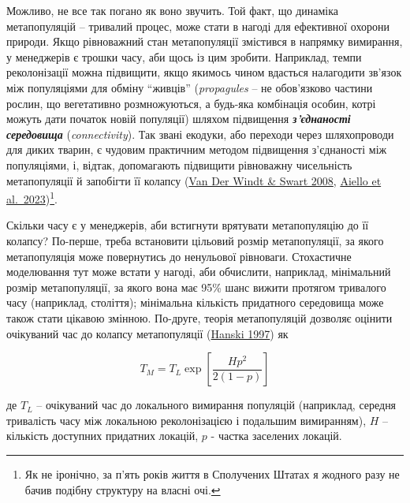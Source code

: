 \documentclass[
  11pt,
]{book}
\begin{document}
Можливо, не все так погано як воно звучить. Той факт, що динаміка метапопуляцій -- тривалий процес, може стати в нагоді для ефективної охорони природи. Якщо рівноважний стан метапопуляції змістився в напрямку вимирання, у менеджерів є трошки часу, аби щось із цим зробити. Наприклад, темпи реколонізації можна підвищити, якщо якимось чином вдасться налагодити зв'язок між популяціями для обміну ``живців'' (\emph{propagules} -- не обов'язково частини рослин, що вегетативно розмножуються, а будь-яка комбінація особин, котрі можуть дати початок новій популяції) шляхом підвищення \textbf{\emph{з'єднаності середовища}} (\emph{connectivity}). Так звані екодуки, або переходи через шляхопроводи для диких тварин, є чудовим практичним методом підвищення з'єднаності між популяціями, і, відтак, допомагають підвищити рівноважну чисельність метапопуляції й запобігти її колапсу (\href{https://doi.org/10.1111/j.1365-2664.2007.01404.x}{Van Der Windt \& Swart 2008}, \href{https://doi.org/10.1007/s10980-023-01600-6}{Aiello et al.~2023})\footnote{Як не іронічно, за п'ять років життя в Сполучених Штатах я жодного разу не бачив подібну структуру на власні очі.}.

Скільки часу є у менеджерів, аби встигнути врятувати метапопуляцію до її колапсу? По-перше, треба встановити цільовий розмір метапопуляції, за якого метапопуляція може повернутись до ненульової рівноваги. Стохастичне моделювання тут може встати у нагоді, аби обчислити, наприклад, мінімальний розмір метапопуляції, за якого вона має 95\% шанс вижити протягом тривалого часу (наприклад, століття); мінімальна кількість придатного середовища може також стати цікавою змінною. По-друге, теорія метапопуляцій дозволяє оцінити очікуваний час до колапсу метапопуляції (\href{htpps://doi.org/10.1016/B978-012323445-2/50007-9}{Hanski 1997}) як

\[T_M = T_L \exp[\frac{Hp^2}{2(1-p)}]\]

де \(T_L\) -- очікуваний час до локального вимирання популяцій (наприклад, середня тривалість часу між локальною реколонізацією і подальшим вимиранням), \(H\) -- кількість доступних придатних локацій, \(p\) - частка заселених локацій.
\end{document}
